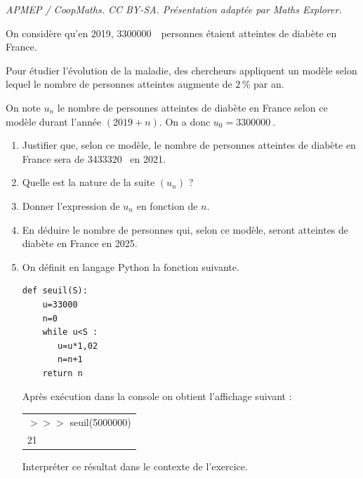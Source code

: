 \documentclass[10pt]{article}
\providecommand{\np}[2][]{{#2~#1}}
\begin{document}
\noindent\textit{APMEP / CoopMaths. CC BY-SA. Présentation adaptée par Maths Explorer.}\par\medskip
\medskip

On considère qu'en 2019, \np{3300000}~personnes étaient atteintes de diabète en France.

Pour étudier l'évolution de la maladie, des chercheurs appliquent un modèle selon lequel le nombre de personnes atteintes augmente de $2$\,\% par an.

On note $u_n$ le nombre de personnes atteintes de diabète en France selon ce modèle durant l'année $(2019 + n)$. On a donc $u_0 = \np{3300000}$.

\medskip

\begin{enumerate}
\item Justifier que, selon ce modèle, le nombre de personnes atteintes de diabète en France sera de \np{3433320} en 2021.
\item Quelle est la nature de la suite $\left(u_n\right)$ ?
\item Donner l'expression de $u_n$ en fonction de $n$.
\item En déduire le nombre de personnes qui, selon ce modèle, seront atteintes de diabète en France en 2025.
\item On définit en langage Python la fonction suivante.

\begin{center}
\begin{lstlisting}[style=python]
def seuil(S): 
    u=33000
    n=0
    while u<S :
       u=u*1,02
       n=n+1
    return n
\end{lstlisting}
\end{center}

Après exécution dans la console on obtient l'affichage suivant :

\begin{center}
\begin{tabular}{|l|}\hline
$>>>$ seuil(5000000)\\
21\\ \hline
\end{tabular}
\end{center}

Interpréter ce résultat dans le contexte de l'exercice.
\end{enumerate}

\bigskip
\end{document}
